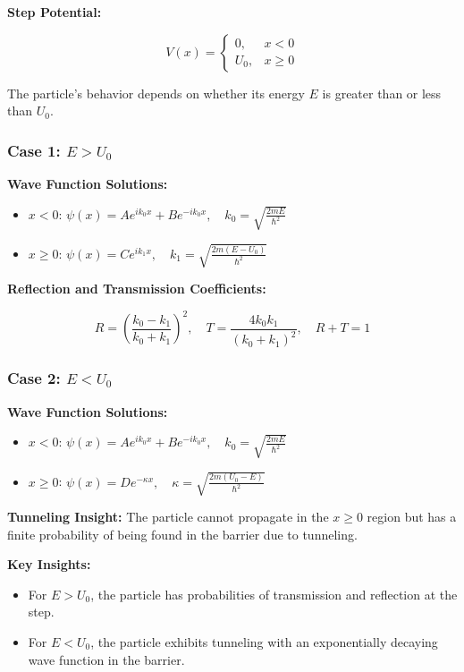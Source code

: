 \documentclass{article}
\newcommand{\eqbox}[1]{\begin{tcolorbox}[colback=gray!10] #1 \end{tcolorbox}}
\newcommand{\conceptbox}[1]{\begin{tcolorbox}[colback=blue!10] #1 \end{tcolorbox}}
\begin{document}
\conceptbox{
\textbf{Step Potential:}
\eqbox{
\[
V(x) = 
\begin{cases} 
0, & x < 0 \\ 
U_0, & x \geq 0 
\end{cases}
\]
}
The particle's behavior depends on whether its energy \( E \) is greater than or less than \( U_0 \).
}

\conceptbox{
\subsubsection*{Case 1: \( E > U_0 \)}

\textbf{Wave Function Solutions:}
\eqbox{
\begin{itemize}
    \item \( x < 0 \): \( \psi(x) = Ae^{ik_0x} + Be^{-ik_0x}, \quad k_0 = \sqrt{\frac{2mE}{\hbar^2}} \)
    \item \( x \geq 0 \): \( \psi(x) = Ce^{ik_1x}, \quad k_1 = \sqrt{\frac{2m(E - U_0)}{\hbar^2}} \)
\end{itemize}
}

\textbf{Reflection and Transmission Coefficients:}
\eqbox{
\[
R = \left( \frac{k_0 - k_1}{k_0 + k_1} \right)^2, \quad T = \frac{4k_0k_1}{(k_0 + k_1)^2}, \quad R + T = 1
\]
}
}


\conceptbox{
\subsubsection*{Case 2: \( E < U_0 \)}
\textbf{Wave Function Solutions:}
\eqbox{
\begin{itemize}
    \item \( x < 0 \): \( \psi(x) = Ae^{ik_0x} + Be^{-ik_0x}, \quad k_0 = \sqrt{\frac{2mE}{\hbar^2}} \)
    \item \( x \geq 0 \): \( \psi(x) = De^{-\kappa x}, \quad \kappa = \sqrt{\frac{2m(U_0 - E)}{\hbar^2}} \)
\end{itemize}
}

\textbf{Tunneling Insight:}
The particle cannot propagate in the \( x \geq 0 \) region but has a finite probability of being found in the barrier due to tunneling.
}

\conceptbox{
\textbf{Key Insights:}
\begin{itemize}
    \item For \( E > U_0 \), the particle has probabilities of transmission and reflection at the step.
    \item For \( E < U_0 \), the particle exhibits tunneling with an exponentially decaying wave function in the barrier.
\end{itemize}
}
\end{document}
